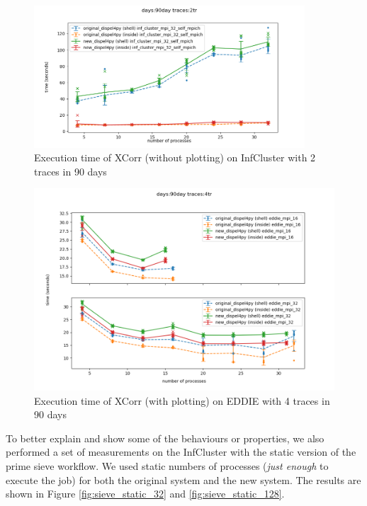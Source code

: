 \begin{figure}[h]
\centering
    \includegraphics[width=0.9\textwidth]{figures/xcorr_infcluster_90day_2tr}
\caption{Execution time of XCorr (without plotting) on InfCluster with 2 traces in 90 days}
\label{fig:xcorr_infcluster_90_2}
\end{figure}

\begin{figure}[h]
\centering
    \includegraphics[width=1.10\textwidth]{figures/xcorr_eddie_90day_4tr}
\caption{Execution time of XCorr (with plotting) on EDDIE with 4 traces in 90 days}
\label{fig:xcorr_eddie}
\end{figure}

To better explain and show some of the behaviours or properties, we also performed a set of measurements on the InfCluster with the static version of the prime sieve workflow. We used static numbers of processes (\emph{just enough} to execute the job) for both the original system and the new system. The results are shown in Figure  \ref{fig:sieve_static_32} and \ref{fig:sieve_static_128}.

